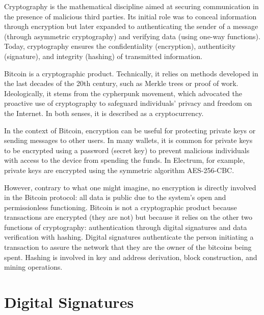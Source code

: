 \documentclass[
  a5paper,
  smalldemyvopaper,10pt,twoside,onecolumn,openright,extrafontsizes,hidelinks]{memoir}
\begin{document}

Cryptography is the mathematical discipline aimed at securing
communication in the presence of malicious third parties. Its initial
role was to conceal information through encryption but later expanded to
authenticating the sender of a message (through asymmetric cryptography)
and verifying data (using one-way functions). Today, cryptography
ensures the confidentiality (encryption), authenticity (signature), and
integrity (hashing) of transmitted information.

Bitcoin is a cryptographic product. Technically, it relies on methods
developed in the last decades of the 20th century, such as Merkle trees
or proof of work. Ideologically, it stems from the cypherpunk movement,
which advocated the proactive use of cryptography to safeguard
individuals' privacy and freedom on the Internet. In both senses, it is
described as a cryptocurrency.

In the context of Bitcoin, encryption can be useful for protecting
private keys or sending messages to other users. In many wallets, it is
common for private keys to be encrypted using a password (secret key) to
prevent malicious individuals with access to the device from spending
the funds. In Electrum, for example, private keys are encrypted using
the symmetric algorithm AES-256-CBC.

However, contrary to what one might imagine, no encryption is directly
involved in the Bitcoin protocol: all data is public due to the system's
open and permissionless functioning. Bitcoin is not a cryptographic
product because transactions are encrypted (they are not) but because it
relies on the other two functions of cryptography: authentication
through digital signatures and data verification with hashing. Digital
signatures authenticate the person initiating a transaction to assure
the network that they are the owner of the bitcoins being spent. Hashing
is involved in key and address derivation, block construction, and
mining operations.

\section*{Digital Signatures}\label{digital-signatures}

\end{document}

